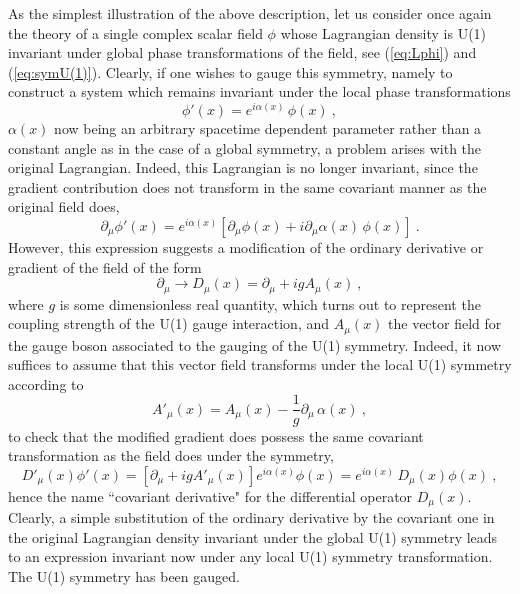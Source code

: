 \documentclass[a4paper,11pt]{article}
\begin{document}
As the simplest illustration of the above description, let us consider
once again the theory of a single complex scalar field $\phi$ whose
Lagrangian density is U(1) invariant under global phase transformations
of the field, see (\ref{eq:Lphi}) and (\ref{eq:symU(1)}). Clearly,
if one wishes to gauge this symmetry, namely to construct a
system which remains invariant under the local phase transformations
\begin{equation}
\phi'(x)=e^{i\alpha(x)}\,\phi(x)\ ,
\end{equation}
$\alpha(x)$ now being an arbitrary spacetime dependent parameter rather
than a constant angle as in the case of a global symmetry, a problem
arises with the original Lagrangian. Indeed, this Lagrangian is no longer
invariant, since the gradient contribution does not transform in
the same covariant manner as the original field does,
\begin{equation}
\partial_\mu\phi'(x)=e^{i\alpha(x)}\left[\partial_\mu\phi(x)+
i\partial_\mu\alpha(x)\,\phi(x)\right]\ .
\end{equation}
However, this expression suggests a modification of the ordinary derivative
or gradient of the field of the form
\begin{equation}
\partial_\mu\longrightarrow D_\mu(x)=\partial_\mu+igA_\mu(x)\ ,
\end{equation}
where $g$ is some dimensionless real quantity, which turns out to represent
the coupling strength of the U(1) gauge interaction, and $A_\mu(x)$ the vector
field for the gauge boson associated to the gauging of the U(1) symmetry.
Indeed, it now suffices to assume that this vector field transforms under
the local U(1) symmetry according to
\begin{equation}
A'_\mu(x)=A_\mu(x)-\frac{1}{g}\partial_\mu\,\alpha(x)\ ,
\end{equation}
to check that the modified gradient does possess the same covariant 
transformation as the field does under the symmetry,
\begin{equation}
D'_\mu(x)\phi'(x)=
\left[\partial_\mu+igA'_\mu(x)\right]e^{i\alpha(x)}\phi(x)=
e^{i\alpha(x)}\,D_\mu(x)\phi(x)\ ,
\end{equation}
hence the name ``covariant derivative" for the differential operator 
$D_\mu(x)$. Clearly, a simple substitution of the ordinary derivative
by the covariant one in the original Lagrangian density invariant under
the global U(1) symmetry leads to an expression invariant now under any
local U(1) symmetry transformation. The U(1) symmetry has been gauged.
\end{document}
